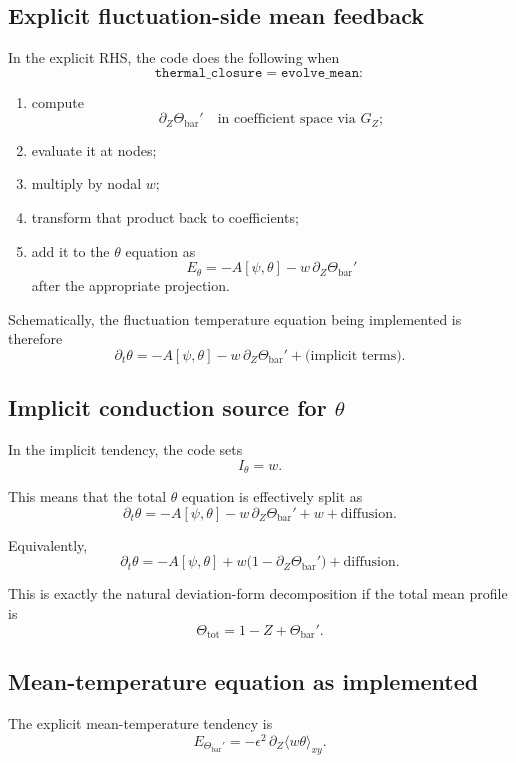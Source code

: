 \documentclass[11pt]{article}
\begin{document}
\subsection{Explicit fluctuation-side mean feedback}

In the explicit RHS, the code does the following when
\[
\texttt{thermal\_closure} = \texttt{evolve\_mean}:
\]

\begin{enumerate}
\item compute
\[
\partial_Z \Theta_{\mathrm{bar}}'
\quad \text{in coefficient space via } G_Z;
\]
\item evaluate it at nodes;
\item multiply by nodal $w$;
\item transform that product back to coefficients;
\item add it to the $\theta$ equation as
\[
E_\theta = -A[\psi,\theta] - w\,\partial_Z\Theta_{\mathrm{bar}}'
\]
after the appropriate projection.
\end{enumerate}

Schematically, the fluctuation temperature equation being implemented is therefore
\[
\partial_t \theta
=
-A[\psi,\theta]
-w\,\partial_Z\Theta_{\mathrm{bar}}'
+\text{(implicit terms)}.
\]

\subsection{Implicit conduction source for $\theta$}

In the implicit tendency, the code sets
\[
I_\theta = w.
\]

This means that the total $\theta$ equation is effectively split as
\[
\partial_t\theta
=
-A[\psi,\theta]
-w\,\partial_Z\Theta_{\mathrm{bar}}'
+w
+\text{diffusion}.
\]

Equivalently,
\[
\partial_t\theta
=
-A[\psi,\theta]
+w\bigl(1-\partial_Z\Theta_{\mathrm{bar}}'\bigr)
+\text{diffusion}.
\]

This is exactly the natural deviation-form decomposition if the total mean profile is
\[
\Theta_{\mathrm{tot}} = 1-Z+\Theta_{\mathrm{bar}}'.
\]

\subsection{Mean-temperature equation as implemented}

The explicit mean-temperature tendency is
\[
E_{\Theta_{\mathrm{bar}}'}
=
-\epsilon^2\,\partial_Z\langle w\theta\rangle_{xy}.
\]
\end{document}
